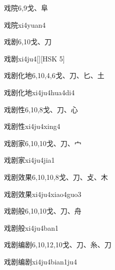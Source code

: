\begin{entry}{戏院}{6,9}{⼽、⾩}
  \begin{phonetics}{戏院}{xi4yuan4}
  \end{phonetics}
\end{entry}

\begin{entry}{戏剧}{6,10}{⼽、⼑}
  \begin{phonetics}{戏剧}{xi4ju4}[][HSK 5]
  \end{phonetics}
\end{entry}

\begin{entry}{戏剧化地}{6,10,4,6}{⼽、⼑、⼔、⼟}
  \begin{phonetics}{戏剧化地}{xi4ju4hua4di4}
  \end{phonetics}
\end{entry}

\begin{entry}{戏剧性}{6,10,8}{⼽、⼑、⼼}
  \begin{phonetics}{戏剧性}{xi4ju4xing4}
  \end{phonetics}
\end{entry}

\begin{entry}{戏剧家}{6,10,10}{⼽、⼑、⼧}
  \begin{phonetics}{戏剧家}{xi4ju4jia1}
  \end{phonetics}
\end{entry}

\begin{entry}{戏剧效果}{6,10,10,8}{⼽、⼑、⽁、⽊}
  \begin{phonetics}{戏剧效果}{xi4ju4xiao4guo3}
  \end{phonetics}
\end{entry}

\begin{entry}{戏剧般}{6,10,10}{⼽、⼑、⾈}
  \begin{phonetics}{戏剧般}{xi4ju4ban1}
  \end{phonetics}
\end{entry}

\begin{entry}{戏剧编剧}{6,10,12,10}{⼽、⼑、⽷、⼑}
  \begin{phonetics}{戏剧编剧}{xi4ju4bian1ju4}
  \end{phonetics}
\end{entry}


